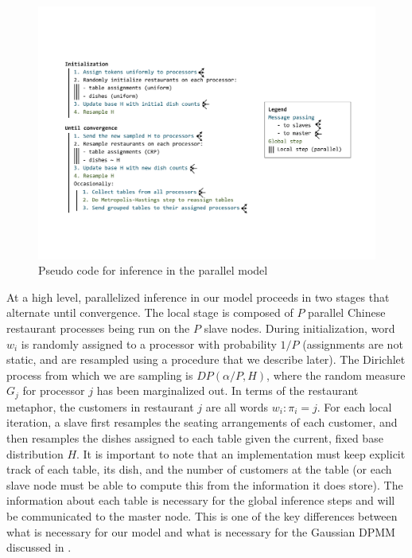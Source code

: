 \begin{figure}[h]
  \centering
  \includegraphics[width=1.05\textwidth]{fig/parallel_code_schema}
  \caption{Pseudo code for inference in the parallel model}
  \label{fig:inference}
\end{figure}

At a high level, parallelized inference in our model proceeds in two
stages that alternate until convergence. The local stage is composed
of $P$ parallel Chinese restaurant processes being run on the $P$
slave nodes. During initialization, word $w_i$ is randomly assigned to
a processor with probability $1/P$ (assignments are not static, and
are resampled using a procedure that we describe later). The Dirichlet
process from which we are sampling is $DP(\alpha/P, H)$, where the
random measure $G_j$ for processor $j$ has been marginalized out. In
terms of the restaurant metaphor, the customers in restaurant $j$ are
all words $w_i : {\pi_i = j}$. For each local iteration, a slave first
resamples the seating arrangements of each customer, and then
resamples the dishes assigned to each table given the current, fixed
base distribution $H$. It is important to note that an implementation
must keep explicit track of each table, its dish, and the number of
customers at the table (or each slave node must be able to compute
this from the information it does store). The information about each
table is necessary for the global inference steps and will be
communicated to the master node. This is one of the key differences
between what is necessary for our model and what is necessary for the
Gaussian DPMM discussed in \cite{williamson2013}.

